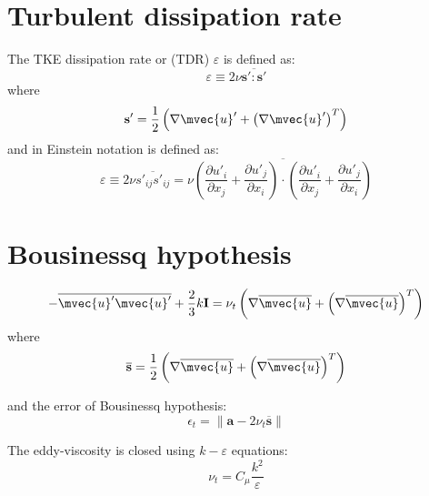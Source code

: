 \section*{Turbulent dissipation rate}

The TKE dissipation rate or (TDR) $\varepsilon$ is defined as:
\begin{equation}
\varepsilon \equiv 2 \nu \overline{\textbf{s}':\textbf{s}'}
\end{equation}
where 
\begin{equation}
\textbf{s}' = \frac{1}{2} \left(\nabla \mvec{u}' + \left(\nabla \mvec{u}'\right)^T\right)
\end{equation}
and in Einstein notation is defined as:
\begin{equation}
\varepsilon  \equiv 2\nu \overline {{s'_{\textit{ij}}}{s'_{\textit{ij}}}}  = \nu \overline {\left( {\frac{{\partial {u'_i}}}{{\partial {x_j}}} + \frac{{\partial {u'_j}}}{{\partial {x_i}}}} \right) \cdot \left( {\frac{{\partial {u'_i}}}{{\partial {x_j}}} + \frac{{\partial {u'_j}}}{{\partial {x_i}}}} \right)}
\end{equation}


\section*{Bousinessq hypothesis}

\begin{equation}
- \overline {\mvec{u}'\mvec{u}'}  + \frac{2}{3}k \textbf{I} = {\nu_t}\left( \nabla \overline{\mvec{u}} + \left(\nabla \overline{\mvec{u}}\right)^T \right)
\end{equation}
where
\begin{equation}
\overline{\textbf{s}} = \frac{1}{2}\left( \nabla \overline{\mvec{u}} + \left(\nabla \overline{\mvec{u}}\right)^T \right)
\end{equation}

and the error of Bousinessq hypothesis: 
\begin{equation}
\epsilon_t = \left\| \textbf{a} - 2{\nu_t}\overline {\textbf{s} } \right\|
\end{equation}

The eddy-viscosity is closed using $k-\varepsilon$ equations:
\begin{equation}
\nu_t = C_{\mu}\frac{k^2}{\varepsilon}
\end{equation}
